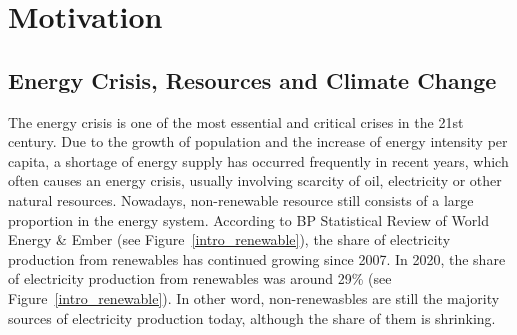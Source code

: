 
\section{Motivation}
\subsection{Energy Crisis, Resources and Climate Change}
The energy crisis is one of the most essential and critical crises in the 21st century. Due to the growth of population and the increase of energy intensity per capita, a shortage of energy supply has occurred frequently in recent years, which often causes an energy crisis, usually involving scarcity of oil, electricity or other natural resources. Nowadays, non-renewable resource still consists of a large proportion in the energy system. According to BP Statistical Review of World Energy \& Ember (see Figure~\ref{intro_renewable}), the share of electricity production from renewables has continued growing since 2007. In 2020, the share of electricity production from renewables was around 29\% (see Figure~\ref{intro_renewable}). In other word, non-renewasbles are still the majority sources of electricity production today, although the share of them is shrinking.\\


